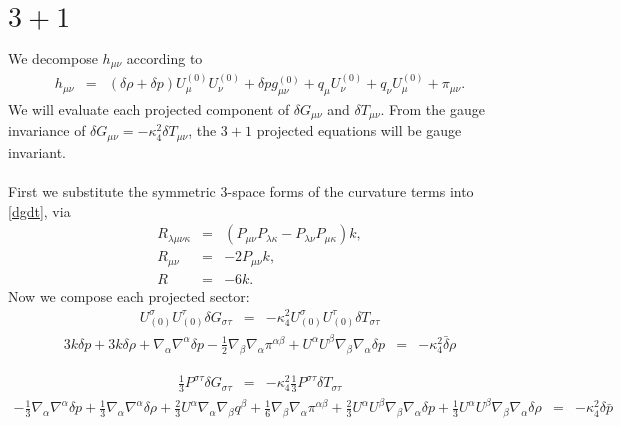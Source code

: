 \documentclass[10pt,letterpaper]{article}
\numberwithin{equation}{section}
\begin{document}
\section{$3+1$}
We decompose $h_{\mu\nu}$ according to
\begin{eqnarray}
h_{\mu\nu} &=&  (\delta\rho + \delta p)U_\mu^{(0)} U_\nu^{(0)} + \delta p g_{\mu\nu}^{(0)} +q_\mu U_\nu^{(0)} +q_\nu U_\mu^{(0)} +  \pi_{\mu\nu}.
\end{eqnarray}
We will evaluate each projected component of $\delta G_{\mu\nu}$ and $\delta T_{\mu\nu}$. From the gauge invariance of $\delta G_{\mu\nu} = -\kappa^2_4\delta T_{\mu\nu}$, the $3+1$ projected equations will be gauge invariant. 
\\ \\
First we substitute the symmetric 3-space forms of the curvature terms into \eqref{dgdt}, via
\begin{eqnarray}
R_{\lambda\mu\nu\kappa} &=& (P_{\mu\nu}P_{\lambda\kappa}-P_{\lambda\nu}P_{\mu\kappa})k,
\nonumber\\
R_{\mu\nu} &=& -2 P_{\mu\nu}k,
\nonumber\\
R&=& -6k.
\end{eqnarray}
Now we compose each projected sector:
\begin{eqnarray}
U^\sigma_{(0)}U^\tau_{(0)}\delta G_{\sigma\tau} &=& -\kappa^2_4 U^\sigma_{(0)}U^\tau_{(0)}\delta T_{\sigma\tau}
\end{eqnarray}
\begin{eqnarray}
3 k \delta p + 3 k \delta \rho + \nabla_{\alpha}\nabla^{\alpha}\delta p -  \tfrac{1}{2} \nabla_{\beta}\nabla_{\alpha}\pi^{\alpha \beta} + U^{\alpha} U^{\beta} \nabla_{\beta}\nabla_{\alpha}\delta p &=& -\kappa^2_4 \bar \delta \rho
\end{eqnarray}

\begin{eqnarray}
 \frac13 P^{\sigma\tau}\delta G_{\sigma\tau}&=& -\kappa^2_4  \frac13 P^{\sigma\tau}\delta T_{\sigma\tau}
\end{eqnarray}
\begin{eqnarray}
 - \tfrac{1}{3} \nabla_{\alpha}\nabla^{\alpha}\delta p + \tfrac{1}{3} \nabla_{\alpha}\nabla^{\alpha}\delta \rho + \tfrac{2}{3} U^{\alpha} \nabla_{\alpha}\nabla_{\beta}q^{\beta} + \tfrac{1}{6} \nabla_{\beta}\nabla_{\alpha}\pi^{\alpha \beta} + \tfrac{2}{3} U^{\alpha} U^{\beta} \nabla_{\beta}\nabla_{\alpha}\delta p + \tfrac{1}{3} U^{\alpha} U^{\beta} \nabla_{\beta}\nabla_{\alpha}\delta \rho&=& -\kappa^2_4 \delta \bar p
\end{eqnarray}
\end{document}
